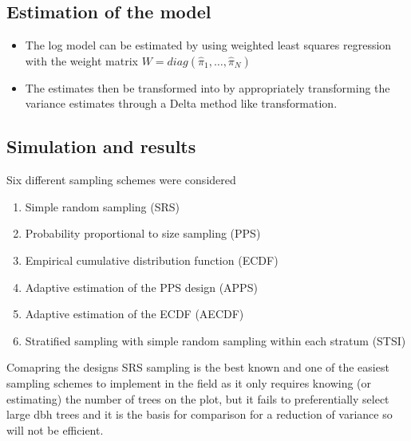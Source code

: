 \documentclass{beamer}
\begin{document}
%
\begin{frame}
  \section{Estimation of the model}
  \begin{itemize}
    \item The log model can be estimated by using weighted least squares regression with the weight matrix $W = diag(\hat{\pi}_1, \ldots, \hat{\pi}_N)$ \vspace{3mm}
    \item The estimates then be transformed into by appropriately transforming the variance estimates through a Delta method like transformation.
  \end{itemize}
\end{frame}
%
\begin{frame}
  \section{Simulation and results}
%
  Six different sampling schemes were considered
  \begin{enumerate}
    \item Simple random sampling (SRS)
    \item Probability proportional to size sampling (PPS)
    \item Empirical cumulative distribution function (ECDF)
    \item Adaptive estimation of the PPS design (APPS)
    \item Adaptive estimation of the ECDF (AECDF)
    \item Stratified sampling with simple random sampling within each stratum (STSI)
  \end{enumerate}
\end{frame}
%
\begin{frame}
  Comapring the designs
  SRS sampling is the best known and one of the easiest sampling schemes to implement in the field as it only requires knowing (or estimating) the number of trees on the plot, but it fails to preferentially select large dbh trees and it is the basis for comparison for a reduction of variance so will not be efficient.
\end{frame}
%
\end{document}
